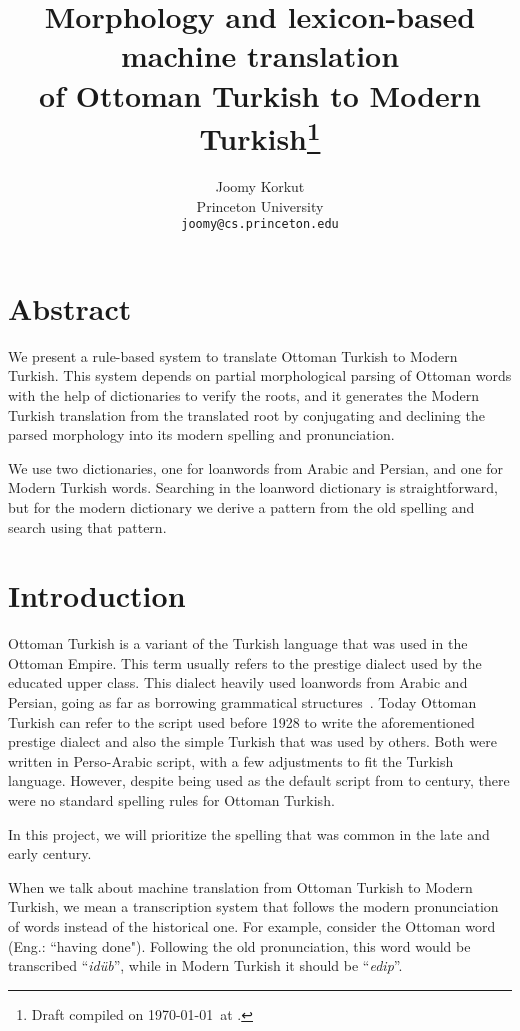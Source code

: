 \documentclass[10pt,twocolumn]{article}
\title{Morphology and lexicon-based machine translation\\of Ottoman Turkish to Modern Turkish\footnote{Draft compiled on \today\ at \currenttime.}}
\author{
  Joomy Korkut\\
  \normalsize Princeton University\\
  \normalsize \texttt{joomy@cs.princeton.edu}
}
\date{}
\theoremstyle{nonumberplain}
\newcommand{\otto}[1]{\RLE{\ottoman{}\Large{}#1}}
\newcommand{\word}[1]{``\emph{#1}''}
\begin{document}
\setlength{\abovedisplayskip}{-17pt}
\setlength{\belowdisplayskip}{0pt}
\setlength{\abovedisplayshortskip}{0pt}
\setlength{\belowdisplayshortskip}{0pt}

\maketitle

\section*{Abstract}
We present a rule-based system to translate Ottoman Turkish to Modern Turkish.
This system depends on partial morphological parsing of Ottoman words with the help of
dictionaries to verify the roots, and it generates the Modern Turkish
translation from the translated root by conjugating and declining the parsed
morphology into its modern spelling and pronunciation.

We use two dictionaries, one for loanwords from Arabic and
Persian, and one for Modern Turkish words. Searching in the loanword dictionary
is straightforward, but for the modern dictionary we derive a pattern from the
old spelling and search using that pattern.

\section{Introduction}

Ottoman Turkish is a variant of the Turkish language that was used in the
Ottoman Empire. This term usually refers to the prestige dialect used by the
educated upper class. This dialect heavily used loanwords from Arabic and
Persian, going as far as borrowing grammatical
structures~\cite{redhouse1884simplified, hagopian1907ottoman, strauss2011linguistic}.
Today Ottoman Turkish can refer to the script used before 1928 to write the
aforementioned prestige dialect and also the simple Turkish that was used by
others. Both were written in Perso-Arabic script, with a few adjustments to fit
the Turkish language.
However, despite being used as the default script from  to 
century, there were no standard spelling rules for Ottoman Turkish.

In this project, we will prioritize the spelling that was common
in the late  and early  century.

When we talk about machine translation from Ottoman Turkish to Modern Turkish,
we mean a transcription system that follows the modern pronunciation of words
instead of the historical one.
For example, consider the Ottoman word \otto{ايدوب} (Eng.: ``having done").
Following the old pronunciation, this word would be transcribed \word{idüb}, while
in Modern Turkish it should be \word{edip}.
\end{document}
